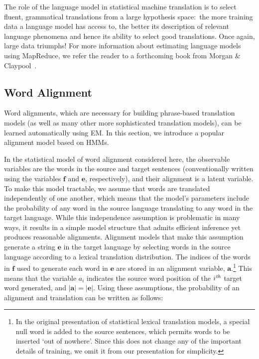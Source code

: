 The role of the language model in statistical machine translation is
to select fluent, grammatical translations from a large hypothesis
space:\ the more training data a language model has access to, the
better its description of relevant language phenomena and hence its
ability to select good translations.  Once again, large data triumphs!
For more information about estimating language models using MapReduce,
we refer the reader to a forthcoming book from Morgan \&
Claypool~\cite{Brants_2010}.

\subsection{Word Alignment}

Word alignments, which are necessary for building phrase-based
translation models (as well as many other more sophisticated
translation models), can be learned automatically using EM.  In this
section, we introduce a popular alignment model based on HMMs.

In the statistical model of word alignment considered here, the
observable variables are the words in the source and target sentences
(conventionally written using the variables $\textbf{f}$ and
$\textbf{e}$, respectively), and their alignment is a latent variable.
To make this model tractable, we assume that words are translated
independently of one another, which means that the model's parameters
include the probability of any word in the source language translating
to any word in the target language.  While this independence
assumption is problematic in many ways, it results in a simple model
structure that admits efficient inference yet produces reasonable
alignments.  Alignment models that make this assumption generate a
string $\textbf{e}$ in the target language by selecting words in the
source language according to a lexical translation distribution.  The
indices of the words in $\textbf{f}$ used to generate each word in
$\textbf{e}$ are stored in an alignment variable,
$\textbf{a}$.\footnote{In the original presentation of statistical
  lexical translation models, a special null word is added to the
  source sentences, which permits words to be inserted `out of
  nowhere'.  Since this does not change any of the important details
  of training, we omit it from our presentation for simplicity.} This
means that the variable $a_i$ indicates the source word position of
the $i^{\textrm{\emph{th}}}$ target word generated, and $|\textbf{a}|
= |\textbf{e}|$.  Using these assumptions, the probability of an
alignment and translation can be written as follows:

